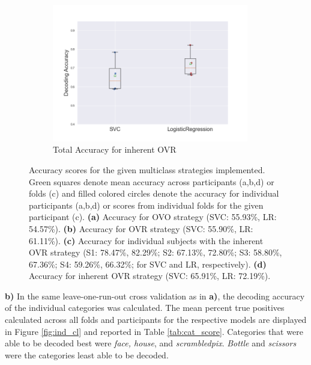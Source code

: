 \documentclass[11pt, a4paper]{article}
\begin{document}
\begin{figure}[hbt!]
\begin{subfigure}[b]{0.49\linewidth}
        \label{fig:ind_acc}
        \end{subfigure}
        \begin{subfigure}[b]{0.49\linewidth}
        \includegraphics[width=\linewidth, height=6cm]{acc_tot_new.png}
        \caption{Total Accuracy for inherent OVR}
        \label{fig:tot_acc}
        \end{subfigure}
    \caption{Accuracy scores for the given multiclass strategies implemented. Green squares denote mean accuracy across participants (a,b,d) or folds (c) and filled colored circles denote the accuracy for individual participants (a,b,d) or scores from individual folds for the given participant (c). \textbf{(a)} Accuracy for OVO strategy (SVC: 55.93\%, LR: 54.57\%). \textbf{(b)} Accuracy for OVR strategy (SVC: 55.90\%, LR: 61.11\%). \textbf{(c)} Accuracy for individual subjects with the inherent OVR strategy (S1: 78.47\%, 82.29\%; S2: 67.13\%, 72.80\%; S3: 58.80\%, 67.36\%; S4: 59.26\%, 66.32\%; for SVC and LR, respectively). \textbf{(d)} Accuracy for inherent OVR strategy (SVC: 65.91\%, LR: 72.19\%).}
    \label{fig:all_acc}
\end{figure}

%
\textbf{b)} In the same leave-one-run-out cross validation as in \textbf{a)}, the decoding accuracy of the individual categories was calculated. The mean percent true positives calculated across all folds and participants for the respective models are displayed in Figure \ref{fig:ind_cl} and reported in Table \ref{tab:cat_score}. Categories that were able to be decoded best were \textit{face, house}, and \textit{scrambledpix}. \textit{Bottle} and \textit{scissors} were the categories least able to be decoded.  
\end{document}
